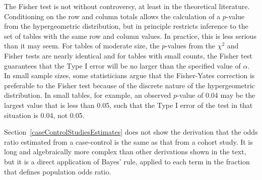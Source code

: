 The Fisher test is not without controversy, at least in the theoretical literature.  Conditioning on the row and column totals allows the calculation of a $p$-value from the hypergeometric distribution, but in principle restricts inference to the set of tables with the same row and column values.  In practice, this is less serious than it may seem. For tables of moderate size, the $p$-values from the $\chi^2$ and Fisher tests are nearly identical and for tables with small counts, the Fisher test guarantees that the Type I error will be no larger than the specified value of $\alpha$.   In small sample sizes, some statisticians argue that the Fisher-Yates correction is preferable to the Fisher test because of the discrete nature of the hypergeometric distribution.  In small tables, for example, an observed $p$-value of 0.04 may be the largest value that is less than 0.05, such that the Type I error of the test in that situation is 0.04, not 0.05.

Section~\ref{caseControlStudiesEstimates} does not show the derivation that the odds ratio estimated from a case-control is the same as that from a cohort study. It is long and algebraically more complex than other derivations shown in the text, but it is a direct application of Bayes' rule, applied to each term in the fraction that defines population odds ratio.
